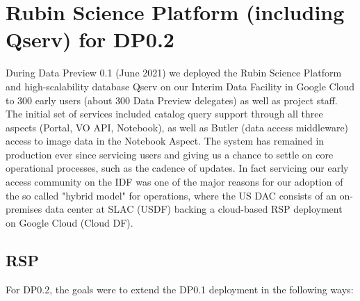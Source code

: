 \section{Rubin Science Platform (including Qserv) for DP0.2} \label{sec:rspqserv}

During Data Preview 0.1 (June 2021) we deployed the Rubin Science Platform and high-scalability database Qserv on our Interim Data Facility in Google Cloud to 300 early users (about 300 Data Preview delegates) as well as project staff.
The initial set of services included catalog query support through all three aspects (Portal, VO API, Notebook), as well as Butler (data access middleware) access to image data in the Notebook Aspect.
The system has remained in production ever since servicing users and giving us a chance to settle on core operational processes, such as the cadence of updates.
In fact servicing our early access community on the IDF was one of the major reasons for our adoption of the so called "hybrid model" for operations, where the US DAC consists of an on-premises data center at SLAC (USDF) backing a cloud-based RSP deployment on Google Cloud (Cloud DF).

\subsection{RSP}\label{sec:rsp}

For DP0.2, the goals were to extend the DP0.1 deployment in the following ways:

